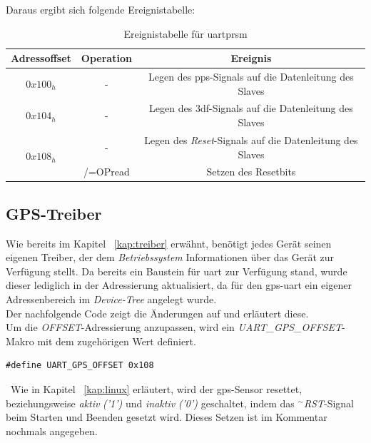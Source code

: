 Daraus ergibt sich folgende Ereignistabelle:\\
\begin{table}[h]
\centering
\begin{tabular}{c|c|c}
\toprule
\multicolumn{1}{c|}{\textbf{Adressoffset}} & \multicolumn{1}{c|}{\textbf{Operation}} & \multicolumn{1}{c}{\textbf{Ereignis}} \\
\midrule
\centering
$0x100_{h}$ & - & Legen des \ac{pps}-Signals auf die Datenleitung des Slaves\\
\hline
$0x104_{h}$  & - & Legen des \ac{3df}-Signals auf die Datenleitung des Slaves\\
\hline
  \multirow{2}{*}{$0x108_{h}$}
            & - & Legen des \emph{Reset}-Signals auf die Datenleitung des Slaves\\
    \cline{2-3}
            & /=OPread & Setzen des Resetbits \\
\bottomrule
\end{tabular}
\caption{Ereignistabelle für \ac{uart}prsm}
\label{tab:EreignisseReset}
\end{table}


\subsection{GPS-Treiber}\label{kap:gpstreiber}

Wie bereits im Kapitel ~\ref{kap:treiber} erwähnt, benötigt jedes Gerät seinen eigenen Treiber, der dem \emph{Betriebssystem}
Informationen über das Gerät zur Verfügung stellt. Da bereits ein Baustein für \ac{uart} zur Verfügung stand,
wurde dieser lediglich in der Adressierung aktualisiert, da für den \ac{gps}-\ac{uart} ein eigener Adressenbereich
im \emph{Device-Tree} angelegt wurde.\\
Der nachfolgende Code zeigt die Änderungen auf und erläutert diese.\\
Um die \emph{OFFSET}-Adressierung anzupassen,
wird ein \emph{UART\_GPS\_OFFSET}-Makro mit dem zugehörigen Wert definiert.\\

\begin{lstlisting}[caption={Anpassung des \emph{Offset}-Bereichs im Treiber},label={code:driveroffset}]
  #define UART_GPS_OFFSET 0x108
\end{lstlisting}

\ Wie in Kapitel ~\ref{kap:linux} erläutert, wird der \ac{gps}-Sensor resettet,
beziehungsweise \emph{aktiv} \emph{('1')} und \emph{inaktiv} \emph{('0')} geschaltet,
indem das \emph{\(^\sim\)RST}-Signal beim Starten  und Beenden gesetzt wird. Dieses Setzen ist im Kommentar
nochmals angegeben.\\


